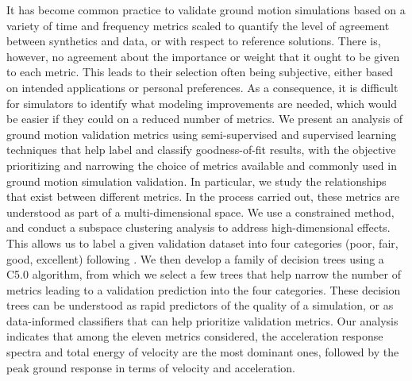 % 
It has become common practice to validate ground motion simulations based on a variety of time and frequency metrics scaled to quantify the level of agreement between synthetics and data, or with respect to reference solutions. There is, however, no agreement about the importance or weight that it ought to be given to each metric. This leads to their selection often being subjective, either based on intended applications or personal preferences. As a consequence, it is difficult for simulators to identify what modeling improvements are needed, which would be easier if they could   on a reduced number of metrics. We present an analysis of ground motion validation metrics using semi-supervised and supervised learning techniques that help label and classify goodness-of-fit results, with the objective  prioritizing and narrowing the choice of metrics available and commonly used in ground motion simulation validation.  In particular, we study the relationships that exist between   different metrics. In the process carried out, these metrics are understood as part of a multi-dimensional space. We use a constrained \kmeans{} method, and conduct a subspace clustering analysis to address high-dimensional effects. This allows us to label a given validation dataset into four categories (poor, fair, good, excellent) following  . We then develop a family of decision trees using a C5.0 algorithm, from which we select a few trees that help narrow the number of metrics leading to a validation prediction into the four categories. These decision trees can be understood as rapid predictors of the quality of a simulation, or as   data-informed classifiers that can help prioritize validation metrics. Our analysis indicates that among the eleven metrics considered, the acceleration response spectra and total energy of velocity are the most dominant ones, followed by the peak ground response in terms of velocity and acceleration. 
